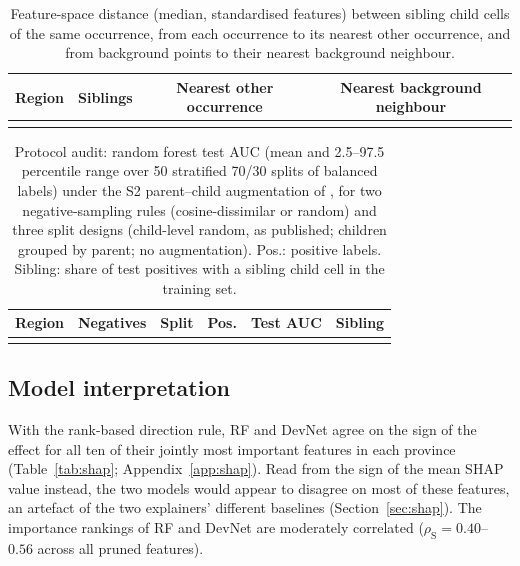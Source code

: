 \documentclass[pdflatex,sn-apa]{sn-jnl}
\begin{document}
\begin{table}[t]
\caption{Feature-space distance (median, standardised features) between sibling child cells of the same occurrence, from each occurrence to its nearest other occurrence, and from background points to their nearest background neighbour.}\label{tab:audit-sim}
\footnotesize
\begin{tabular*}{0.8\textwidth}{@{\extracolsep\fill}lccc}
\toprule
Region & Siblings & Nearest other occurrence & Nearest background neighbour \\
\midrule
\botrule
\end{tabular*}
\end{table}

\begin{table}[t]
\caption{Protocol audit: random forest test AUC (mean and 2.5--97.5 percentile range over 50 stratified 70/30 splits of balanced labels) under the S2 parent--child augmentation of \citet{Parsa2024}, for two negative-sampling rules (cosine-dissimilar or random) and three split designs (child-level random, as published; children grouped by parent; no augmentation). Pos.: positive labels. Sibling: share of test positives with a sibling child cell in the training set.}\label{tab:audit}
\scriptsize
\setlength{\tabcolsep}{2.5pt}
\begin{tabular*}{\textwidth}{@{\extracolsep\fill}lllccc}
\toprule
Region & Negatives & Split & Pos. & Test AUC & Sibling \\
\midrule
\botrule
\end{tabular*}
\end{table}

\subsection{Model interpretation}\label{sec:res-shap}

With the rank-based direction rule, RF and DevNet agree on the sign of the effect for all ten of their jointly most important features in each province (Table~\ref{tab:shap}; Appendix~\ref{app:shap}). Read from the sign of the mean SHAP value instead, the two models would appear to disagree on most of these features, an artefact of the two explainers' different baselines (Section~\ref{sec:shap}). The importance rankings of RF and DevNet are moderately correlated ($\rho_{\mathrm{S}} = 0.40$--$0.56$ across all pruned features).
\end{document}

